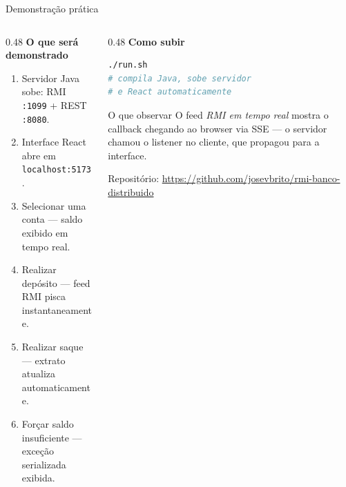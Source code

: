 \documentclass[aspectratio=169]{beamer}
\newcommand{\code}[1]{\texttt{#1}}
\begin{document}
\begin{frame}[fragile]{Demonstração prática}
    \begin{columns}[T]
        \begin{column}{0.48\textwidth}
            \textbf{O que será demonstrado}
            \begin{enumerate}
                \item Servidor Java sobe: RMI \code{:1099} + REST \code{:8080}.
                \item Interface React abre em \code{localhost:5173}.
                \item Selecionar uma conta — saldo exibido em tempo real.
                \item Realizar depósito — feed RMI pisca instantaneamente.
                \item Realizar saque — extrato atualiza automaticamente.
                \item Forçar saldo insuficiente — exceção serializada exibida.
            \end{enumerate}
        \end{column}

        \begin{column}{0.48\textwidth}
            \textbf{Como subir}
\begin{lstlisting}[language=bash,basicstyle=\ttfamily\tiny]
./run.sh
# compila Java, sobe servidor
# e React automaticamente
\end{lstlisting}

            \vspace{0.3cm}
            \begin{alertblock}{O que observar}
                O feed \textit{RMI em tempo real} mostra o callback chegando ao browser via SSE — o servidor chamou o listener no cliente, que propagou para a interface.
            \end{alertblock}

            \vspace{0.2cm}
            \centering
            \scriptsize Repositório: \url{https://github.com/josevbrito/rmi-banco-distribuido}
        \end{column}
    \end{columns}
\end{frame}

\end{document}
